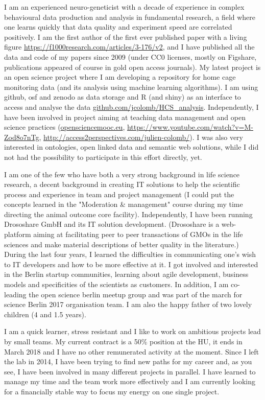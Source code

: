 I am an experienced neuro-geneticist with a decade of experience in complex behavioural data production and analysis in fundamental research, a field where one learns quickly that data quality and experiment speed are correlated positively. I am the first author of the first ever published paper with a living figure \url{https://f1000research.com/articles/3-176/v2}, and I have published all the data and code of my papers since 2009 (under CC0 licenses, mostly on Figshare, publications appeared of course in gold open access journals). My latest project is an open science project where I am developing a repository for home cage monitoring data (and its analysis using machine learning algorithms). I am using github, osf and zenodo as data storage and R (and shiny) as an interface to access and analyse the data \url{github.com/jcolomb/HCS_analysis}. Independently, I have been involved in project aiming at teaching data management and open science practices (\url{opensciencemooc.eu}, \url{https://www.youtube.com/watch?v=M-Zod8o7nTg}, \url{http://access2perspectives.com/julien-colomb/}). I was also very interested in ontologies, open linked data and semantic web solutions, while I did not had the possibility to participate in this effort directly, yet.

I am one of the few who have both a very strong background in life science research, a decent background in creating IT solutions to help the scientific process and experience in team and project management (I could put the concepts learned in the "Moderation \& management" course during my time directing the animal outcome core facility). 
Independently, I have been running Drososhare GmbH and its IT solution development. (Drososhare is a web-platform aiming at facilitating peer to peer transactions of GMOs in the life sciences and make material descriptions of better quality in the literature.) During the last four years, I learned the difficulties in communicating one's wish to IT developers and how to be more effective at it. I got involved and interested in the Berlin startup communities, learning about agile development, business models and specificities of the scientists as customers. In addition, I am co-leading the open science berlin meetup group and was part of the march for science Berlin 2017 organisation team. I am also the happy father of two lovely children (4 and 1.5 years).

\newpage 

I am  a quick learner, stress resistant and I like to work on ambitious projects lead by small teams. My current contract is a 50\% position at the HU, it ends in March 2018 and I have no other remunerated activity at the moment. 
Since I left the lab in 2014, I have been trying to find new paths for my career and,
as you see, I have been involved in many different projects in parallel. I have learned to manage my time and the team work more effectively and I am currently looking for a financially stable way to focus my energy on one single project. 

